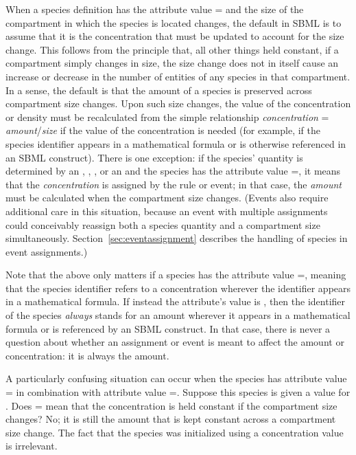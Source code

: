 When a species definition has the attribute value
= and the size of the
compartment in which the species is located changes, the default
in SBML is to assume that it is the concentration that must be
updated to account for the size change.  This follows from the
principle that, all other things held constant, if a compartment
simply changes in size, the size change does not in itself cause
an increase or decrease in the number of entities of any species
in that compartment.  In a sense, the default is that the amount
of a species is preserved across compartment size changes.  Upon
such size changes, the value of the concentration or density must
be recalculated from the simple relationship \emph{concentration}
= \emph{amount}/\emph{size} if the value of the concentration is
needed (for example, if the species identifier appears in a
mathematical formula or is otherwise referenced in an SBML
construct).  There is one exception: if the species' quantity is
determined by an \AssignmentRule, \RateRule, \AlgebraicRule, or an
\EventAssignment and the species has the attribute value
=, it means that the
\emph{concentration} is assigned by the rule or event; in that
case, the \emph{amount} must be calculated when the compartment
size changes.  (Events also require additional care in this
situation, because an event with multiple assignments could
conceivably reassign both a species quantity and a compartment
size simultaneously.  Section~\ref{sec:eventassignment} describes
the handling of species in event assignments.)

Note that the above only matters if a species has the attribute
value =, meaning that the
species identifier refers to a concentration wherever the
identifier appears in a mathematical formula.  If instead the
attribute's value is , then the identifier of the
species \emph{always} stands for an amount wherever it appears in
a mathematical formula or is referenced by an SBML construct.  In
that case, there is never a question about whether an assignment
or event is meant to affect the amount or concentration: it is
always the amount.

A particularly confusing situation can occur when the species has
attribute value = in combination with
attribute value =.
Suppose this species is given a value for
.  Does =
mean that the concentration is held constant if the compartment
size changes?  No; it is still the amount that is kept constant
across a compartment size change.  The fact that the species was
initialized using a concentration value is irrelevant.


